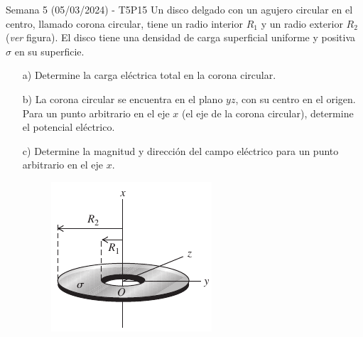 \begin{frame}{Semana 5 (05/03/2024) - T5P15}
    \small
    Un disco delgado con un agujero circular en el centro, llamado corona circular, tiene un radio interior $R_1$ y un radio exterior $R_2$ (\textit{ver} figura). El disco tiene una densidad de carga superficial uniforme y positiva $\sigma$ en su superficie.

\begin{itemize}
    \item[a)] Determine la carga
eléctrica total en la corona circular.
\item[b)] La corona circular se encuentra
en el plano $yz$, con su centro en el
origen. Para un punto arbitrario en
el eje $x$ (el eje de la corona circular), determine el potencial eléctrico.
\item[c)] Determine la magnitud y dirección del campo eléctrico para un punto arbitrario en
el eje $x$.

\begin{figure}[H]
        \centering
        \includegraphics[scale=0.4]{figures/t5p15.png}
    \end{figure}

\end{itemize}
    
\end{frame}

